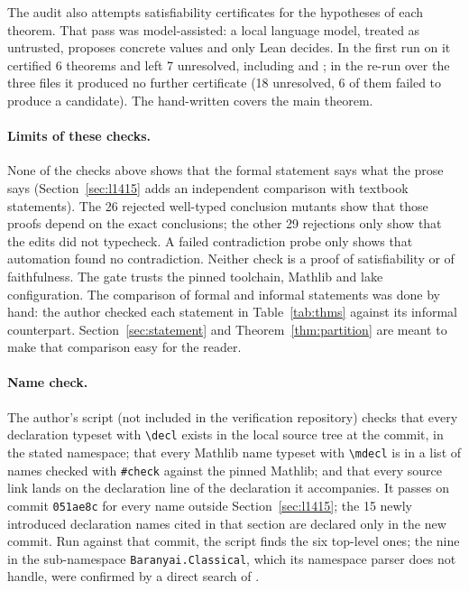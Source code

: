 \documentclass[11pt]{article}
\theoremstyle{definition}
\theoremstyle{remark}
\newcommand{\lean}[1]{\texttt{#1}}
\newcommand{\shortcommit}{051ae8c}
\begin{document}
The audit also attempts satisfiability certificates for the hypotheses of each theorem. That pass
was model-assisted: a local language model, treated as untrusted, proposes concrete values and only
Lean decides. In the first run on  it certified 6 theorems and left 7 unresolved,
including  and ; in the re-run over the three files it produced no
further certificate (18 unresolved, 6 of them failed to produce a candidate). The hand-written
 covers the main theorem.

\paragraph{Limits of these checks.} None of the checks above shows that the formal statement says what
the prose says (Section~\ref{sec:l1415} adds an independent comparison with textbook statements). The 26 rejected well-typed conclusion mutants show that those proofs depend on
the exact conclusions; the other 29 rejections only show that the edits did not typecheck. A failed contradiction probe
only shows that automation found no contradiction. Neither check is a proof of satisfiability or of faithfulness. The gate trusts the pinned toolchain, Mathlib and lake
configuration. The comparison of formal and informal statements was done by hand: the author
checked each statement in Table~\ref{tab:thms} against its informal counterpart.
Section~\ref{sec:statement} and Theorem~\ref{thm:partition} are meant to make that comparison easy
for the reader.

\paragraph{Name check.} The author's script  (not included in the verification repository) checks that every
declaration typeset with \lean{\textbackslash decl} exists in the local source tree at the commit, in
the stated namespace; that every Mathlib name typeset with \lean{\textbackslash mdecl} is in a list of
names checked with \lean{\#check} against the pinned Mathlib; and that every source link lands on the
declaration line of the declaration it accompanies. It passes on commit \texttt{\shortcommit} for
every name outside Section~\ref{sec:l1415}; the 15 newly introduced declaration names cited in that section are declared only in the new
commit. Run against that commit, the script finds the six top-level ones; the nine in the
sub-namespace \lean{Baranyai.Classical}, which its namespace parser does not handle, were confirmed by
a direct search of .
\end{document}

